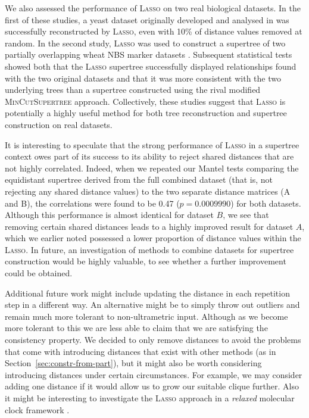 We also assessed the performance of \textsc{Lasso} on two real biological
datasets. In the first of these studies, a yeast dataset originally developed
and analysed in \cite{west14ribosomal} was successfully reconstructed by
\textsc{Lasso}, even with 10\% of distance values removed at random. In the
second study, \textsc{Lasso} was used to construct a supertree of two
partially overlapping wheat NBS marker datasets \cite{gediflux,
  muge}. Subsequent statistical tests showed both that the \textsc{Lasso}
supertree successfully displayed relationships found with the two original
datasets and that it was more consistent with the two underlying trees than a
supertree constructed using the rival modified \textsc{MinCutSupertree}
approach. Collectively, these studies suggest that \textsc{Lasso} is
potentially a highly useful method for both tree reconstruction and supertree
construction on real datasets.

It is interesting to speculate that the strong performance of \textsc{Lasso}
in a supertree context owes part of its success to its ability to reject
shared distances that are not highly correlated. Indeed, when we repeated our
Mantel tests comparing the equidistant supertree derived from the full
combined dataset (that is, not rejecting any shared distance values) to the
two separate distance matrices (A and B), the correlations were found to be
0.47 ($p = 0.0009990$) for both datasets. Although this performance is almost
identical for dataset $B$, we see that removing certain shared distances leads
to a highly improved result for dataset $A$, which we earlier noted possessed
a lower proportion of distance values within the \textsc{Lasso}.  In future,
an investigation of methods to combine datasets for supertree construction
would be highly valuable, to see whether a further improvement could be
obtained.

Additional future work might include updating the distance in each repetition
step in a different way.  An alternative might be to simply throw out outliers
and remain much more tolerant to non-ultrametric input.  Although as we become
more tolerant to this we are less able to claim that we are satisfying the
consistency property.  We decided to only remove distances to avoid the
problems that come with introducing distances that exist with other methods
(as in Section~\ref{sec:constr-from-part}), but it might also be worth
considering introducing distances under certain circumstances.  For example,
we may consider adding one distance if it would allow us to grow our suitable
clique further.  Also it might be interesting to investigate the
\textsc{Lasso} approach in a {\em relaxed} molecular clock framework
\cite{drummond06relaxed}.

